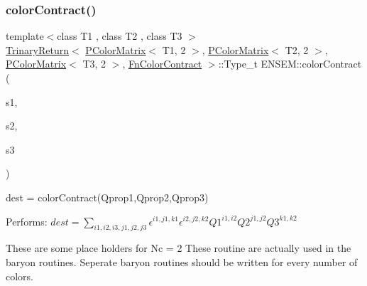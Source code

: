 \subsubsection{\texorpdfstring{colorContract()}{colorContract()}\hspace{0.1cm}{\footnotesize\ttfamily [3/4]}}
{\footnotesize\ttfamily template$<$class T1 , class T2 , class T3 $>$ \\
\mbox{\hyperlink{structENSEM_1_1TrinaryReturn}{Trinary\+Return}}$<$ \mbox{\hyperlink{classENSEM_1_1PColorMatrix}{P\+Color\+Matrix}}$<$ T1, 2 $>$, \mbox{\hyperlink{classENSEM_1_1PColorMatrix}{P\+Color\+Matrix}}$<$ T2, 2 $>$, \mbox{\hyperlink{classENSEM_1_1PColorMatrix}{P\+Color\+Matrix}}$<$ T3, 2 $>$, \mbox{\hyperlink{structENSEM_1_1FnColorContract}{Fn\+Color\+Contract}} $>$\+::Type\+\_\+t E\+N\+S\+E\+M\+::color\+Contract (\begin{DoxyParamCaption}\item[{const \mbox{\hyperlink{classENSEM_1_1PColorMatrix}{P\+Color\+Matrix}}$<$ T1, 2 $>$ \&}]{s1,  }\item[{const \mbox{\hyperlink{classENSEM_1_1PColorMatrix}{P\+Color\+Matrix}}$<$ T2, 2 $>$ \&}]{s2,  }\item[{const \mbox{\hyperlink{classENSEM_1_1PColorMatrix}{P\+Color\+Matrix}}$<$ T3, 2 $>$ \&}]{s3 }\end{DoxyParamCaption})\hspace{0.3cm}{\ttfamily [inline]}}



dest = color\+Contract(\+Qprop1,\+Qprop2,\+Qprop3) 

Performs\+: $dest = \sum_{i1,i2,i3,j1,j2,j3} \epsilon^{i1,j1,k1}\epsilon^{i2,j2,k2} Q1^{i1,i2} Q2^{j1,j2} Q3^{k1,k2}$

These are some place holders for Nc = 2 These routine are actually used in the baryon routines. Seperate baryon routines should be written for every number of colors. \mbox{\label{group__primcolormatrix_ga2cd5ca8c1ac1d4fbf5c4d27665ccb996}} 
